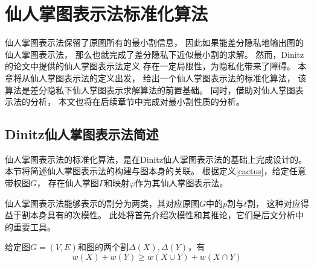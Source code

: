 \chapter{仙人掌图表示法标准化算法}

仙人掌图表示法保留了原图所有的最小割信息，
因此如果能差分隐私地输出图的仙人掌图表示法，
那么也就完成了差分隐私下近似最小割的求解。
然而，Dinitz的论文\cite{dinitz1976structure}中提供的仙人掌图表示法定义
存在一定局限性，为隐私化带来了障碍。
本章将从仙人掌图表示法的定义出发，
给出一个仙人掌图表示法的标准化算法，
该算法是差分隐私下仙人掌图表示求解算法的前置基础。
同时，借助对仙人掌图表示法的分析，
本文也将在后续章节中完成对最小割性质的分析。

\section{Dinitz仙人掌图表示法简述}

仙人掌图表示法的标准化算法，是在Dinitz仙人掌图表示法\cite{dinitz1976structure}的基础上完成设计的。
本节将简述仙人掌图表示法的构建与图本身的关联。
根据定义\ref{cactus}，给定任意带权图$G$，
存在仙人掌图$\Gamma$和映射$\varphi$作为其仙人掌图表示法。

仙人掌图表示法能够表示的割分为两类，其对应原图$G$中的$p$割与$t$割，
这种对应得益于割本身具有的次模性。
此处将首先介绍次模性和其推论，它们是后文分析中的重要工具。


\begin{lemma}[割的次模性]\cite{cunningham1985minimum}
  给定图$G=(V,E)$和图的两个割$\Delta(X),\Delta(Y)$，有
  \begin{equation}
    w(X)+w(Y)\geq w(X\cup Y)+w(X\cap Y)
  \end{equation}
\end{lemma}

